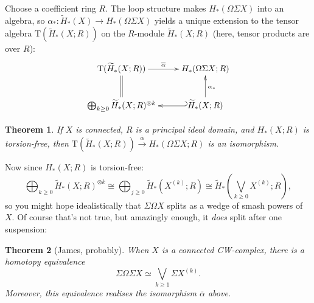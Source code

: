 \documentclass{article}
\newcommand{\Suspend}{\Sigma}
\newcommand{\Loops}{\Omega}
\newtheorem{thm}{Theorem}[section]
\begin{document}
Choose a coefficient ring $R$.
The loop structure makes $H_* (\Loops \Suspend X)$ into an algebra, so $\alpha_*: \widetilde H_*(X) \to H_* (\Loops \Suspend X)$ yields a unique extension to the tensor algebra $\mathrm{T}(\widetilde H_*(X;R))$ on the $R$-module $\widetilde H_*(X;R)$ (here, tensor products are over $R$):
\[\xymatrix{
\mathrm{T}(\widetilde H_*(X;R))\ar[r]^{\overline\alpha}&H_*(\Omega\Sigma X;R)\\
\ar@{=}[u]\bigoplus_{k\geq0}\widetilde H_*(X;R)^{\otimes k}&
\widetilde H_*(X;R)\ar@{_{(}->}[l]\ar[u]_{\alpha_*}
}\]
\begin{thm}
If $X$ is connected, $R$ is a principal ideal domain, and $H_*(X; R)$ is torsion-free, then $\mathrm{T} (\widetilde H_*(X; R)) \stackrel{\overline \alpha}{\to} H_*(\Loops \Suspend X; R)$ is an isomorphism.
\end{thm}
Now since $H_*(X; R)$ is torsion-free:
\[\bigoplus_{k \ge 0} \widetilde H_*(X;R)^{\otimes k} \cong \bigoplus_{j \ge 0} \widetilde H_* (X^{(k)};R) \cong \widetilde H_*{\left(\textstyle\bigvee_{k \ge 0} X^{(k)};R\right)},\]
so you might hope idealistically that $\Suspend \Loops X$ splits as a wedge of smash powers of $X$.  Of course that's not true, but amazingly enough, it \emph{does} split after one suspension:
\begin{thm}[James, probably]
When $X$ is a connected CW-complex, there is a homotopy equivalence
\[
\Suspend \Loops \Suspend X \simeq \bigvee_{k \ge 1} \Suspend X^{(k)}
.\]
Moreover, this equivalence realises the isomorphism $\overline\alpha$ above.
\end{thm}
\end{document}
